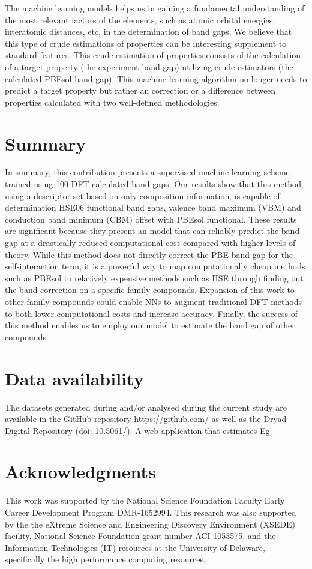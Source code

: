 \documentclass[%
reprint,
superscriptaddress,
citeautoscript,
 amsmath,amssymb,
 aps,
 prl,
floatfix,
]{revtex4-1}
\begin{document}
The machine learning models helps us in gaining a fundamental understanding of the most relevant factors of the elements, such as atomic orbital energies, interatomic distances, etc, in the determination of band gaps. We believe that this type of crude estimations of properties can be interesting supplement to standard features.  This crude estimation of properties consists of the calculation of a target property (the experiment band gap) utilizing crude estimators (the calculated PBEsol band gap). This machine learning algorithm no longer needs to predict a target property but rather an correction or a difference between properties calculated with two well-defined methodologies. 



\section{Summary}

In summary, this contribution presents a supervised machine-learning scheme trained using 100 DFT calculated band gaps. Our results show that this method, using a descriptor set based on only composition information, is capable of determination HSE06 functional band gaps, valence band maximum (VBM) and conduction band minimum (CBM) offset with PBEsol functional. 
These results are significant because they present an model that can reliably predict the band gap at a drastically reduced computational cost compared with higher levels of theory.
While this method does not directly correct the PBE band gap for the self-interaction term, it is a powerful way to map computationally cheap methods such as PBEsol to relatively expensive methods such as HSE through finding out the band correction on a specific family compounds. Expansion of this work to other family compounds could enable NNs to augment traditional DFT methods to both lower computational costs and increase accuracy. 
Finally, the success of this method enables us to employ our model to estimate the band gap of other compounds 

\section{Data availability}

The datasets generated during and/or analysed during the current study are available in
the GitHub repository https://github.com/ as well as the
Dryad Digital Repository (doi: 10.5061/). A web application that estimates Eg 

\section{Acknowledgments}

This work was supported by the National Science Foundation Faculty Early Career Development Program DMR-1652994. This research was also supported by the the eXtreme Science and Engineering Discovery Environment (XSEDE) facility, National Science Foundation grant number ACI-1053575, and the Information Technologies (IT) resources at the University of Delaware, specifically the high performance computing resources.


\end{document}

